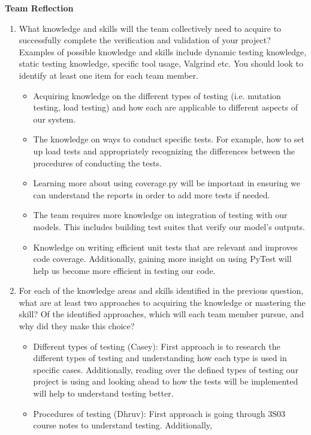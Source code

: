 \documentclass[12pt, titlepage]{article}
\begin{document}
\textbf{Team Reflection}
\begin{enumerate}
  \item What knowledge and skills will the team collectively need to acquire to
  successfully complete the verification and validation of your project?
  Examples of possible knowledge and skills include dynamic testing knowledge,
  static testing knowledge, specific tool usage, Valgrind etc.  You should look to
  identify at least one item for each team member.
  \begin{itemize}
    \item Acquiring knowledge on the different types of testing (i.e. mutation testing, load testing) 
    and how each are applicable to different aspects of our system. 
    \item The knowledge on ways to conduct specific tests. For example, how to set up load tests and appropriately
    recognizing the differences between the procedures of conducting the tests. 
    \item Learning more about using coverage.py will be important in ensuring we can understand the reports
    in order to add more tests if needed. 
    \item The team requires more knowledge on integration of testing with our models. This includes building test suites 
    that verify our model's outputs. 
    \item Knowledge on writing efficient unit tests that are relevant and improves code coverage. Additionally, 
    gaining more insight on using PyTest will help us become more efficient in testing our code. 
  \end{itemize}
  \item For each of the knowledge areas and skills identified in the previous
  question, what are at least two approaches to acquiring the knowledge or
  mastering the skill?  Of the identified approaches, which will each team
  member pursue, and why did they make this choice?
  \begin{itemize}
    \item Different types of testing (Casey): First approach is to research the different types of testing and understanding 
    how each type is used in specific cases. Additionally, reading over the defined types of testing our project is using 
    and looking ahead to how the tests will be implemented will help to understand testing better. 
    \item Procedures of testing (Dhruv): First approach is going through 3S03 course notes to understand testing. Additionally, 

\end{itemize}
\end{enumerate}
\end{document}
